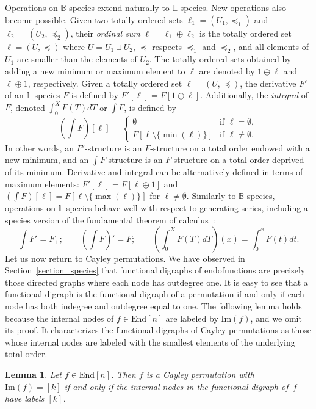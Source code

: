 \documentclass[a4paper,11pt,UKenglish]{article}
\newcommand{\LL}{\mathbb{L}}
\newcommand{\BB}{\mathbb{B}}
\newcommand{\End}{\mathrm{End}}
\newcommand{\Img}{\mathrm{Im}}
\newtheorem{lemma}[theorem]{Lemma}
\theoremstyle{definition}
\begin{document}
Operations on $\BB$-species extend naturally to $\LL$-species.
New operations also become possible. Given two totally ordered sets
$\ell_1=(U_1, \preceq_1)$ and $\ell_2=(U_2,\preceq_2)$, their
\emph{ordinal sum} $\ell=\ell_1 \oplus \ell_2$ is the totally ordered
set $\ell=(U,\preceq)$ where $U=U_1\sqcup U_2$, $\preceq$ respects
$\preceq_1$ and $\preceq_2$, and all elements of $U_1$ are smaller
than the elements of $U_2$.
The totally ordered sets obtained by adding a new minimum or maximum
element to $\ell$ are denoted by $1\oplus\ell$ and $\ell \oplus 1$,
respectively. Given a totally ordered set $\ell=(U,\preceq)$, the
derivative $F'$ of an $\LL$-species $F$ is defined by
$F'[\ell]=F[1\oplus\ell]$. Additionally, the \emph{integral} of $F$,
denoted $\int_0^X F(T) dT$ or $\int F$, is defined by
\[
\left( \int F \right) [\ell] =
\begin{cases}
  \emptyset &  \text{if }\ell = \emptyset, \\
  F[\ell \setminus \{\min(\ell)\}] & \text{if } \ell \neq \emptyset.
\end{cases}
\]
In other words, an $F'$-structure is an $F$-structure on a total
order endowed with a new minimum, and an $\int\! F$-structure
is an $F$-structure on a total order deprived of its minimum.
Derivative and integral can be alternatively defined in terms of
maximum elements: $F'[\ell]=F[\ell\oplus 1]$ and
$(\int F)[\ell]=F[\ell\setminus \{\max(\ell)\}]$ for $\ell\neq\emptyset$.
Similarly to $\BB$-species, operations on $\LL$-species behave well
with respect to generating series, including a species version of
the fundamental theorem of calculus~\cite[equation 35]{BLL}:
$$
\int F' = F_+;
\qquad
\left(\int F\right)' = F;
\qquad
\left( \int_0^X F(T) dT \right)(x) = \int_0^x F(t) dt.
$$
Let us now return to Cayley permutations.
We have observed in Section~\ref{section_species} that functional
digraphs of endofunctions are precisely those directed graphs where
each node has outdegree one. It is easy to see that a functional digraph
is the functional digraph of a permutation if and only if each node
has both indegree and outdegree equal to one.
The following lemma holds because
the internal nodes of $f\in\End[n]$ are labeled by $\Img(f)$, and we
omit its proof.
It characterizes the functional digraphs of Cayley permutations as those
whose internal nodes are labeled with the smallest
elements of the underlying total order.

\begin{lemma}\label{caygraph}
Let $f\in\End[n]$. Then $f$ is a Cayley permutation with $\Img(f)=[k]$
if and only if the internal nodes in the functional digraph of~$f$
have labels $[k]$.
\end{lemma}
\end{document}
